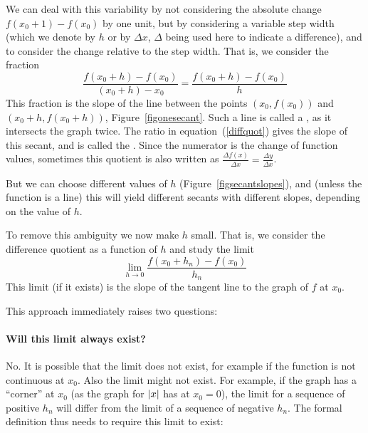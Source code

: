 We can deal with this variability by not considering the absolute change
$f(x_0+1)-f(x_0)$ by one unit, but by
considering a variable step width (which we denote by $h$ or by
$\Delta x$, $\Delta$ being used here to indicate a difference), and to
consider the change relative to the step width. That is, we consider the
fraction
\begin{equation}
\frac{f(x_0+h)-f(x_0)}{(x_0+h)-x_0}=\frac{f(x_0+h)-f(x_0)}{h}
\label{diffquot}
\end{equation}
This fraction is the slope of the line between the points $(x_0,f(x_0))$ and
$(x_0+h,f(x_0+h))$, Figure~\ref{figonesecant}. Such a line is called a , as it intersects the graph
twice. The ratio in equation~(\ref{diffquot}) gives the slope of this secant, and
is called the .
Since the numerator is the change of
function values, sometimes this quotient is also written as $\displaystyle
\frac{\Delta f(x)}{\Delta x}= \frac{\Delta y}{\Delta x}$.

But we can choose different values of $h$ (Figure~\ref{figsecantslopes}),
and (unless the function is a line) this will yield different secants with
different slopes, depending on the value of $h$.

To remove this ambiguity we now make $h$ small. That is, we consider 
the difference quotient as a function of $h$ and study the limit
\[
\lim_{h\to 0}\frac{f(x_0+h_n)-f(x_0)}{h_n}
\]
This limit (if it exists) is the slope of the tangent line to the graph of
$f$ at $x_0$.
\smallskip

This approach immediately raises two questions:

\paragraph{Will this limit always exist?} No. It is possible that the limit
does not exist, for example if the function is not continuous at $x_0$. Also
the limit might not exist.
For example, if the graph
has a ``corner'' at $x_0$ (as the graph for $\left|x\right|$ has at $x_0=0$), the
limit for a sequence of positive $h_n$ will differ from the limit of a
sequence of negative $h_n$. The formal definition thus needs to require this
limit to exist:

